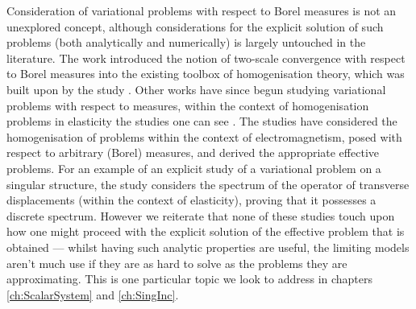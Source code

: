 Consideration of variational problems with respect to Borel measures is not an unexplored concept, although considerations for the explicit solution of such problems (both analytically and numerically) is largely untouched in the literature.
The work \cite{bouchitte2001homogenization} introduced the notion of two-scale convergence with respect to Borel measures into the existing toolbox of homogenisation theory, which was built upon by the study \cite{zhikov2000extension}.
Other works have since begun studying variational problems with respect to measures, within the context of homogenisation problems in elasticity the studies one can see \cite{zhikov2002homogenization, zhikov2003homogenization, cherednichenko2019homogenisation}.
The studies \cite{cherednichenko2018operator, cherednichenko2022operator, cherednichenko2020order} have considered the homogenisation of problems within the context of electromagnetism, posed with respect to arbitrary (Borel) measures, and derived the appropriate effective problems.
For an example of an explicit study of a variational problem on a singular structure, the study \cite{zhikov2013spectrum} considers the spectrum of the operator of transverse displacements (within the context of elasticity), proving that it possesses a discrete spectrum.
However we reiterate that none of these studies touch upon how one might proceed with the explicit solution of the effective problem that is obtained --- whilst having such analytic properties are useful, the limiting models aren't much use if they are as hard to solve as the problems they are approximating.
This is one particular topic we look to address in chapters \ref{ch:ScalarSystem} and \ref{ch:SingInc}.

